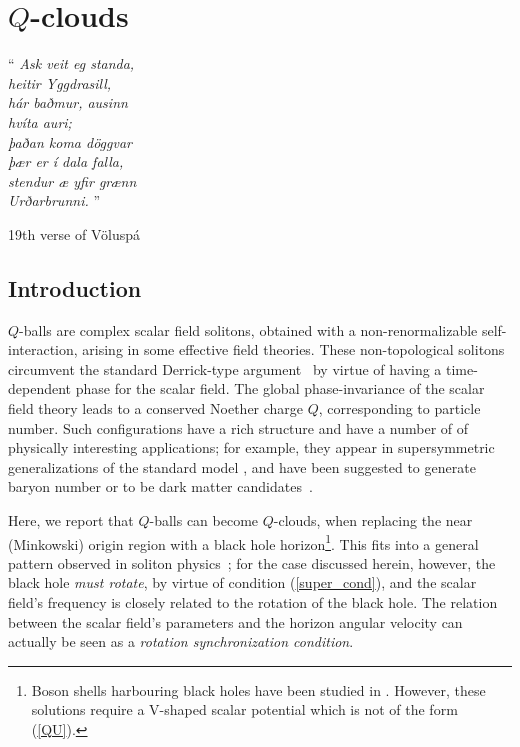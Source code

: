 \chapter{$Q$-clouds}
\label{ch:Q}

\epigraph{``\emph{
Ask veit eg standa, \\
heitir Yggdrasill, \\
hár baðmur, ausinn \\
hvíta auri; \\
þaðan koma döggvar \\
þær er í dala falla, \\
stendur æ yfir grænn \\
Urðarbrunni. 
} 
''}{19th verse of Völuspá}
\section{Introduction}

$Q$-balls are complex scalar field solitons, obtained with a non-renormalizable self-interaction, arising in some effective field theories. 
These non-topological solitons circumvent the standard Derrick-type argument~\cite{Derrick:1964ww} by virtue of having a
time-dependent phase for the scalar field.
The global phase-invariance of the scalar field theory leads to a conserved Noether
charge $Q$, corresponding to particle number.
Such configurations have a rich structure and
have a number of
of physically interesting applications;
for example, they appear in supersymmetric generalizations of the standard model \cite{Kusenko:1997zq}, 
and have been suggested to generate baryon number or to be dark matter candidates~\cite{Kusenko:1997si}.

\bigskip

Here, we report that $Q$-balls can become $Q$-clouds, when replacing the near (Minkowski) origin region with a black hole horizon\footnote{
Boson shells harbouring black holes have been studied in \cite{Kleihaus:2010ep}.
However, these solutions require a V-shaped scalar potential which
is not of the form (\ref{QU}).}.
This fits into a general pattern observed in soliton physics~\cite{Bizon:1994dh,Volkov:1998cc,Herdeiro:2014ima}; for the case discussed herein, however, the black hole \textit{must rotate}, by virtue of condition (\ref{super_cond}), and the scalar field's frequency is closely related to the rotation of the black hole.
The relation between the scalar field's parameters and the horizon angular velocity can actually be seen as a \textit {rotation synchronization condition}.
%
%
